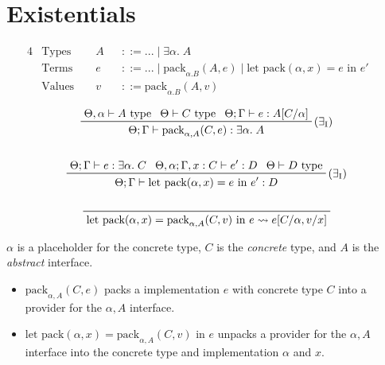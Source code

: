 \documentclass[11pt]{article}
\begin{document}
\section{Existentials}
{

    \begin{alignat*}{4}
    &\text{Types } &&A &&::= ... \mid \exists\alpha.\;A && \\
    &\text{Terms } &&e &&::= ... \mid \text{pack}_{\alpha.B}(A,e) \mid \text{let pack}(\alpha,x) = e\text{ in }e' && \\
    &\text{Values } &&v &&::= \text{pack}_{\alpha.B}(A,v) &&
    \end{alignat*}

    \begin{gather*}
    \prftree[r]{(\(\exists_\text{I}\))}
    {\Theta,\alpha\vdash A\text{ type}}
    {\Theta\vdash C\text{ type}}
    {\Theta;\Gamma\vdash e:A[C/\alpha]}
    {\Theta;\Gamma\vdash \text{pack}_{\alpha,A}(C,e) : \exists\alpha.\;A}
    \\
    \\
    \prftree[r]{(\(\exists_\text{I}\))}
    {\Theta;\Gamma\vdash e:\exists\alpha.\;C}
    {\Theta,\alpha;\Gamma,x:C \vdash e' : D}
    {\Theta\vdash D\text{ type}}
    {\Theta;\Gamma\vdash \text{let pack}(\alpha,x) = e\text{ in }e':D}
    \\
    \\
    \prftree[r]{}
    {\text{let pack}(\alpha,x) = \text{pack}_{\alpha,A}(C,v) \text{ in } e \leadsto e[C/\alpha,v/x]}
    \end{gather*}

    \(\alpha\) is a placeholder for the concrete type, \(C\) is the \textit{concrete} type, and \(A\) is the
    \textit{abstract} interface.

    \begin{itemize}
    \item
    {

        \(\text{pack}_{\alpha,A}(C,e)\) packs a implementation \(e\) with concrete type \(C\) into a provider for the
        \(\alpha,A\) interface.

    }
    \item
    {

        \(\text{let pack}(\alpha, x) = \text{pack}_{\alpha,A}(C,v)\text{ in }e\) unpacks a provider for the \(\alpha,A\)
        interface into the concrete type and implementation \(\alpha\) and \(x\).

    }
    \end{itemize}

}
\end{document}
